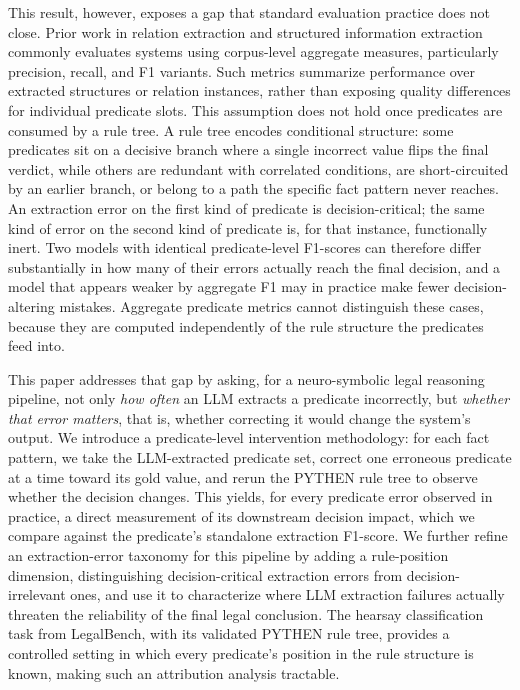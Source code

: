 This result, however, exposes a gap that standard evaluation practice does not close. Prior work in relation extraction and structured information extraction commonly evaluates systems using corpus-level aggregate measures, particularly precision, recall, and F1 variants\cite{olek2023evaluationf1scorerecent,chen2023unifiedviewevaluationmetrics}. Such metrics summarize performance over extracted structures or relation instances, rather than exposing quality differences for individual predicate slots. This assumption does not hold once predicates are consumed by a rule tree. A rule tree encodes conditional structure: some predicates sit on a decisive branch where a single incorrect value flips the final verdict, while others are redundant with correlated conditions, are short-circuited by an earlier branch, or belong to a path the specific fact pattern never reaches. An extraction error on the first kind of predicate is decision-critical; the same kind of error on the second kind of predicate is, for that instance, functionally inert. Two models with identical predicate-level F1-scores can therefore differ substantially in how many of their errors actually reach the final decision, and a model that appears weaker by aggregate F1 may in practice make fewer decision-altering mistakes. Aggregate predicate metrics cannot distinguish these cases, because they are computed independently of the rule structure the predicates feed into.

This paper addresses that gap by asking, for a neuro-symbolic legal reasoning pipeline, not only \emph{how often} an LLM extracts a predicate incorrectly, but \emph{whether that error matters}, that is, whether correcting it would change the system's output. We introduce a predicate-level intervention methodology: for each fact pattern, we take the LLM-extracted predicate set, correct one erroneous predicate at a time toward its gold value, and rerun the PYTHEN rule tree to observe whether the decision changes. This yields, for every predicate error observed in practice, a direct measurement of its downstream decision impact, which we compare against the predicate's standalone extraction F1-score. We further refine an extraction-error taxonomy for this pipeline by adding a rule-position dimension, distinguishing decision-critical extraction errors from decision-irrelevant ones, and use it to characterize where LLM extraction failures actually threaten the reliability of the final legal conclusion. The hearsay classification task from LegalBench\cite{guha2023legalbench}, with its validated PYTHEN rule tree, provides a controlled setting in which every predicate's position in the rule structure is known, making such an attribution analysis tractable.

